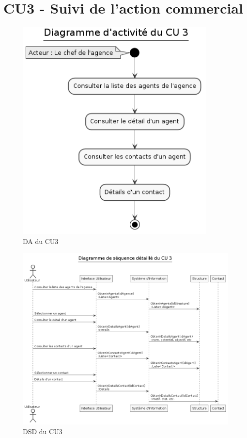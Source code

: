 \clearpage
\section{CU3 - Suivi de l’action commercial}

\begin{figure}[h]
\centering
\includegraphics[width=10cm]{figures/DA_CU3.png}
\caption{DA du CU3}
\end{figure}

\begin{figure}[h]
\centering
\includegraphics[width=\textwidth]{figures/DSD_CU3.png}
\caption{DSD du CU3}
\end{figure}

